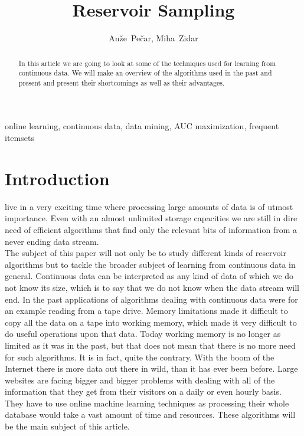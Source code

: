 \documentclass[journal]{IEEEtran/IEEEtran}
\begin{document}
\title{Reservoir Sampling}

\author{Anže~Pečar, Miha~Zidar}%
\maketitle
\begin{abstract}
In this article we are going to look at some of the techniques used for learning from continuous data. We will make an overview of the algorithms used in the past and present and present their shortcomings as well as their advantages. 
\end{abstract}

\begin{IEEEkeywords}
online learning, continuous data, data mining, AUC maximization, frequent itemsets
\end{IEEEkeywords}

\IEEEpeerreviewmaketitle


\section{Introduction}
 live in a very exciting time where processing large amounts of data is of utmost importance. Even with an almost unlimited storage capacities we are still in dire need of efficient algorithms that find only the relevant bits of information from a never ending data stream.\\

The subject of this paper will not only be to study different kinds of reservoir algorithms but to tackle the broader subject of learning from continuous data in general. Continuous data can be interpreted as any kind of data of which we do not know its size, which is to say that we do not know when the data stream will end. In the past applications of algorithms dealing with continuous data were for an example reading from a tape drive. Memory limitations made it difficult to copy all the data on a tape into working memory, which made it very difficult to do useful operations upon that data. Today working memory is no longer as limited as it was in the past, but that does not mean that there is no more need for such algorithms. It is in fact, quite the contrary. With the boom of the Internet there is more data out there in wild, than it has ever been before. Large websites are facing bigger and bigger problems with dealing with all of the information that they get from their visitors on a daily or even hourly basis. They have to use online machine learning techniques as processing their whole database would take a vast amount of time and resources. These algorithms will be the main subject of this article.\\
\end{document}
